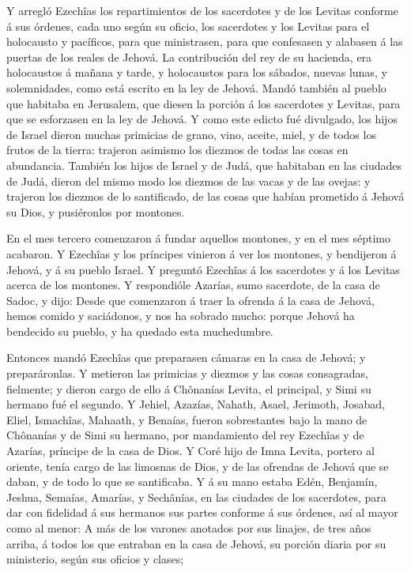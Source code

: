  Y arregló Ezechîas los repartimientos de los sacerdotes y
de los Levitas conforme á sus órdenes, cada uno según su oficio, los
sacerdotes y los Levitas para el holocausto y pacíficos, para que
ministrasen, para que confesasen y alabasen á las puertas de los reales
de Jehová.  La contribución del rey de su hacienda, era
holocaustos á mañana y tarde, y holocaustos para los sábados, nuevas
lunas, y solemnidades, como está escrito en la ley de Jehová.
 Mandó también al pueblo que habitaba en Jerusalem, que
diesen la porción á los sacerdotes y Levitas, para que se esforzasen en
la ley de Jehová.  Y como este edicto fué divulgado, los
hijos de Israel dieron muchas primicias de grano, vino, aceite, miel, y
de todos los frutos de la tierra: trajeron asimismo los diezmos de todas
las cosas en abundancia.  También los hijos de Israel y de
Judá, que habitaban en las ciudades de Judá, dieron del mismo modo los
diezmos de las vacas y de las ovejas: y trajeron los diezmos de lo
santificado, de las cosas que habían prometido á Jehová su Dios, y
pusiéronlos por montones.

 En el mes tercero comenzaron á fundar aquellos montones,
y en el mes séptimo acabaron.  Y Ezechîas y los príncipes
vinieron á ver los montones, y bendijeron á Jehová, y á su pueblo
Israel.  Y preguntó Ezechîas á los sacerdotes y á los
Levitas acerca de los montones.  Y respondióle Azarías,
sumo sacerdote, de la casa de Sadoc, y dijo: Desde que comenzaron á
traer la ofrenda á la casa de Jehová, hemos comido y saciádonos, y nos
ha sobrado mucho: porque Jehová ha bendecido su pueblo, y ha quedado
esta muchedumbre.

 Entonces mandó Ezechîas que preparasen cámaras en la
casa de Jehová; y preparáronlas.  Y metieron las
primicias y diezmos y las cosas consagradas, fielmente; y dieron cargo
de ello á Chônanías Levita, el principal, y Simi su hermano fué el
segundo.  Y Jehiel, Azazías, Nahath, Asael, Jerimoth,
Josabad, Eliel, Ismachîas, Mahaath, y Benaías, fueron sobrestantes bajo
la mano de Chônanías y de Simi su hermano, por mandamiento del rey
Ezechîas y de Azarías, príncipe de la casa de Dios.  Y
Coré hijo de Imna Levita, portero al oriente, tenía cargo de las
limosnas de Dios, y de las ofrendas de Jehová que se daban, y de todo lo
que se santificaba.  Y á su mano estaba Edén, Benjamín,
Jeshua, Semaías, Amarías, y Sechânías, en las ciudades de los
sacerdotes, para dar con fidelidad á sus hermanos sus partes conforme á
sus órdenes, así al mayor como al menor:  A más de los
varones anotados por sus linajes, de tres años arriba, á todos los que
entraban en la casa de Jehová, su porción diaria por su ministerio,
según sus oficios y clases;

